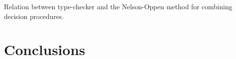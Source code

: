 \documentclass{sigplanconf}
\begin{document}
Relation between type-checker and
the Nelson-Oppen method for combining
decision procedures.


\section {Conclusions}









% 
% 
% 
% 
\end{document}
